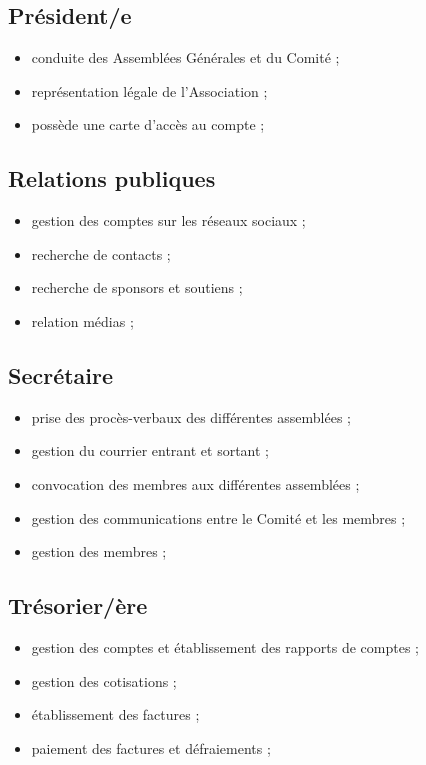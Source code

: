 \documentclass[12pt,twoside]{report}
\begin{document}
\subsection*{Président/e}
\begin{itemize}
\item conduite des Assemblées Générales et du Comité ;
\item représentation légale de l’Association ;
\item possède une carte d’accès au compte ;
\end{itemize}

\subsection*{Relations publiques}
\begin{itemize}
\item gestion des comptes sur les réseaux sociaux ;
\item recherche de contacts ;
\item recherche de sponsors et soutiens ;
\item relation médias ;
\end{itemize}

\subsection*{Secrétaire}
\begin{itemize}
\item prise des procès-verbaux des différentes assemblées ;
\item gestion du courrier entrant et sortant ;
\item convocation des membres aux différentes assemblées ;
\item gestion des communications entre le Comité et les membres ;
\item gestion des membres ;
\end{itemize}

\subsection*{Trésorier/ère}
\begin{itemize}
\item gestion des comptes et établissement des rapports de comptes ;
\item gestion des cotisations ;
\item établissement des factures ;
\item paiement des factures et défraiements ;
\end{itemize}
\end{document}
